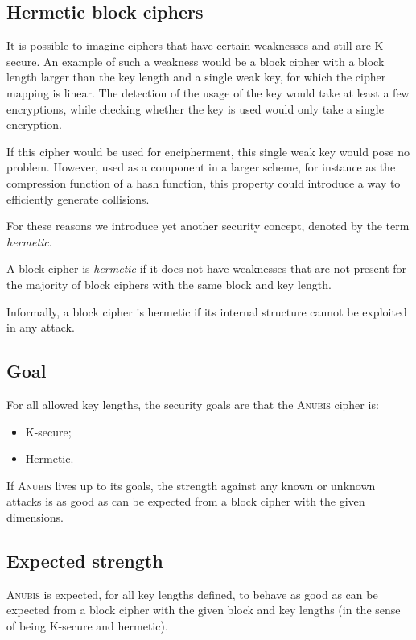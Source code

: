 \documentclass{llncs}
\begin{document}
\subsection{Hermetic block ciphers}

It is possible to imagine ciphers that have certain weaknesses
and still are K-secure. An example of such a weakness would be a
block cipher with a block length larger than the key length and a
single weak key, for which the cipher mapping is linear. The
detection of the usage of the key would take at least a few
encryptions, while checking whether the key is used would only
take a single encryption.

If this cipher would be used for encipherment, this single weak
key would pose no problem. However, used as a component in a
larger scheme, for instance as the compression function of a hash
function, this property could introduce a way to efficiently
generate collisions.

For these reasons we introduce yet another security concept,
denoted by the term \emph{hermetic}.
\begin{definition}
A block cipher is \emph{hermetic} if it does not have weaknesses
that are not present for the majority of block ciphers with the
same block and key length.
\end{definition}
Informally, a block cipher is hermetic if its internal structure
cannot be exploited in any attack.

\subsection{Goal}
For all allowed key lengths, the security goals are that the
\textsc{Anubis} cipher is:
\begin{itemize}
\item K-secure;
\item Hermetic.
\end{itemize}
If \textsc{Anubis} lives up to its goals, the strength against any
known or unknown attacks is as good as can be expected from a
block cipher with the given dimensions.

\subsection{Expected strength}

\textsc{Anubis} is expected, for all key lengths defined, to
behave as good as can be expected from a block cipher with the
given block and key lengths (in the sense of being K-secure and
hermetic).
\end{document}
